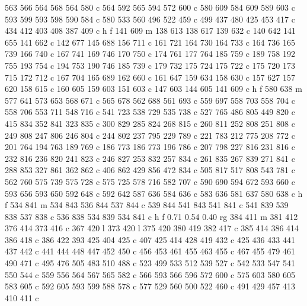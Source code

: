 {{        563 566 564 568 564 580 c
        564 592 565 594 572 600 c
        580 609 584 609 589 603 c
        593 599 593 598 590 584 c
        580 533 560 496 522 459 c
        499 437 480 425 453 417 c
        434 412 403 408 387 409 c
        h f
        141 609 m
        138 613 138 617 139 632 c
        140 642 141 655 141 662 c
        142 677 145 688 156 711 c
        161 721 164 730 164 733 c
        164 736 165 739 166 740 c
        167 741 169 746 170 750 c
        174 761 177 764 185 759 c
        189 758 192 755 193 754 c
        194 753 190 746 185 739 c
        179 732 175 724 175 722 c
        175 720 173 715 172 712 c
        167 704 165 689 162 660 c
        161 647 159 634 158 630 c
        157 627 157 620 158 615 c
        160 605 159 603 151 603 c
        147 603 144 605 141 609 c
        h f
        580 638 m
        577 641 573 653 568 671 c
        565 678 562 688 561 693 c
        559 697 558 703 558 704 c
        558 706 553 711 548 716 c
        541 723 538 729 535 738 c
        527 765 486 805 449 820 c
        415 834 352 841 323 835 c
        300 829 285 824 268 815 c
        260 811 252 808 251 808 c
        249 808 247 806 246 804 c
        244 802 237 795 229 789 c
        221 783 212 775 208 772 c
        201 764 194 763 189 769 c
        186 773 186 773 196 786 c
        207 798 227 816 231 816 c
        232 816 236 820 241 823 c
        246 827 253 832 257 834 c
        261 835 267 839 271 841 c
        288 853 327 861 362 862 c
        406 862 429 856 472 834 c
        505 817 517 808 543 781 c
        562 760 575 739 575 728 c
        575 725 578 716 582 707 c
        590 690 594 672 593 660 c
        593 656 593 650 592 648 c
        592 642 587 636 584 636 c
        583 636 581 637 580 638 c
        h f
        534 841 m
        534 843 536 844 537 844 c
        539 844 541 843 541 841 c
        541 839 539 838 537 838 c
        536 838 534 839 534 841 c
        h f
        0.71 0.54 0.40 rg
        384 411 m
        381 412 376 414 373 416 c
        367 420 l
        373 420 l
        375 420 380 419 382 417 c
        385 414 386 414 386 418 c
        386 422 393 425 404 425 c
        407 425 414 428 419 432 c
        425 436 433 441 437 442 c
        441 444 448 447 452 450 c
        456 453 461 455 463 455 c
        467 455 479 461 490 471 c
        495 476 505 483 510 488 c
        523 499 533 512 539 527 c
        542 533 547 541 550 544 c
        559 556 564 567 565 582 c
        566 593 566 596 572 600 c
        575 603 580 605 583 605 c
        592 605 593 599 588 578 c
        577 529 560 500 522 460 c
        491 429 457 413 410 411 c
}}
